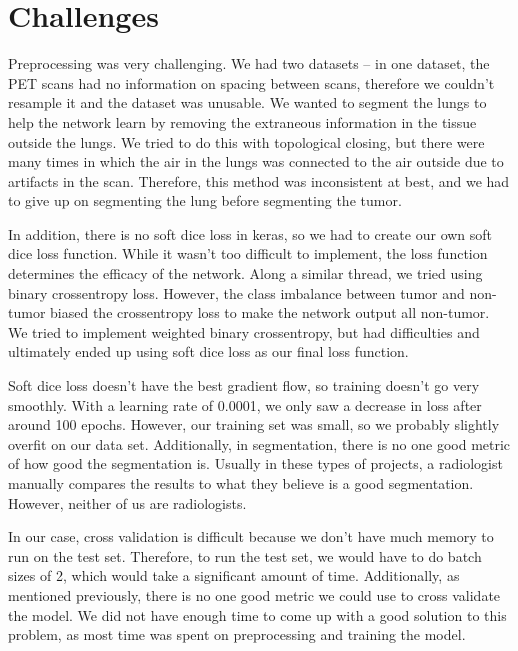 \documentclass[12pt, letterpaper]{article}
\begin{document}
	\section{Challenges}
	Preprocessing was very challenging. We had two datasets -- in one dataset, the PET scans had no information on spacing between scans, therefore we couldn’t resample it and the dataset was unusable. We wanted to segment the lungs to help the network learn by removing the extraneous information in the tissue outside the lungs. We tried to do this with topological closing, but there were many times in which the air in the lungs was connected to the air outside due to artifacts in the scan. Therefore, this method was inconsistent at best, and we had to give up on segmenting the lung before segmenting the tumor.\par
	In addition, there is no soft dice loss in keras, so we had to create our own soft dice loss function. While it wasn’t too difficult to implement, the loss function determines the efficacy of the network. Along a similar thread, we tried using binary crossentropy loss. However, the class imbalance between tumor and non-tumor biased the crossentropy loss to make the network output all non-tumor. We tried to implement weighted binary crossentropy, but had difficulties and ultimately ended up using soft dice loss as our final loss function.\par
Soft dice loss doesn’t have the best gradient flow, so training doesn’t go very smoothly. With a learning rate of 0.0001, we only saw a decrease in loss after around 100 epochs. However, our training set was small, so we probably slightly overfit on our data set. Additionally, in segmentation, there is no one good metric of how good the segmentation is. Usually in these types of projects, a radiologist manually compares the results to what they believe is a good segmentation. However, neither of us are radiologists.\par
	In our case, cross validation is difficult because we don’t have much memory to run on the test set. Therefore, to run the test set, we would have to do batch sizes of 2, which would take a significant amount of time. Additionally, as mentioned previously, there is no one good metric we could use to cross validate the model. We did not have enough time to come up with a good solution to this problem, as most time was spent on preprocessing and training the model.
\end{document}
